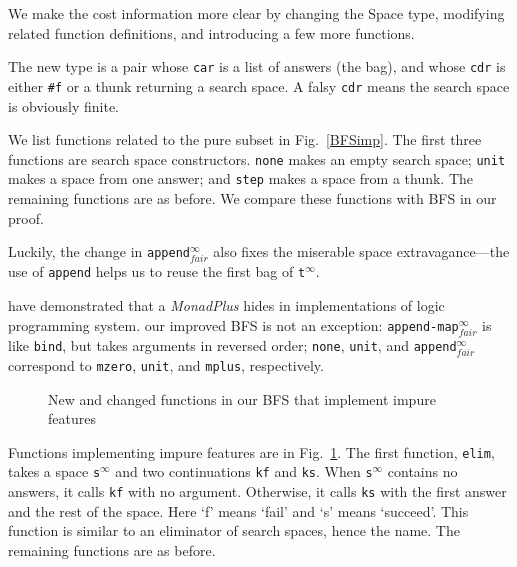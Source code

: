 \documentclass[format=acmlarge, review=true, authordraft=true]{acmart}
\newcommand{\BFSser}[0]{BFS}
\newcommand{\BFSimp}[0]{our improved BFS}
\begin{document}

We make the cost information more clear by changing the Space type, 
modifying related function definitions, and introducing a few more functions.

The new type is a pair whose \texttt{car} is a list of answers (the bag), and 
whose \texttt{cdr} is either \texttt{\#{}f} or a thunk returning a search 
space. A falsy \texttt{cdr} means the search space is obviously finite. 

We list functions related to the pure subset in Fig.~\ref{BFSimp}. The first 
three functions are search space constructors. \texttt{none} makes an empty 
search space; \texttt{unit} makes a space from one answer; and \texttt{step} 
makes a space from a thunk. The remaining functions are as before. We compare 
these functions with \BFSser{} in our proof. 

Luckily, the change in \texttt{append$^\infty_{fair}$} also fixes the miserable 
space extravagance---the use of \texttt{append} helps us to reuse the first bag 
of \texttt{t$^\infty$}.

\citet{kiselyov2005backtracking} have demonstrated that a \emph{MonadPlus} 
hides in implementations of logic programming system. \BFSimp{} is not an 
exception: \texttt{append-map$^\infty_{fair}$} is like \texttt{bind}, but takes 
arguments in reversed order; \texttt{none}, \texttt{unit}, and 
\texttt{append$^\infty_{fair}$} correspond to \texttt{mzero}, \texttt{unit}, and 
\texttt{mplus}, respectively.

\begin{figure}
		
	\caption{New and changed functions in our BFS that implement impure 
		features}
	\label{BFSimp-cont}
\end{figure}


Functions implementing impure features are in Fig.~\ref{BFSimp-cont}. The 
first function, \texttt{elim}, takes a space \texttt{s$^\infty$} and two 
continuations \texttt{kf} and \texttt{ks}. When \texttt{s$^\infty$} contains 
no answers, it calls \texttt{kf} with no argument. Otherwise, it calls 
\texttt{ks} with the first answer and the rest of the space. Here  `f' means 
`fail' and `s' means `succeed'. This function is similar to an eliminator of 
search spaces, hence the name. The remaining functions are as before.
\end{document}
